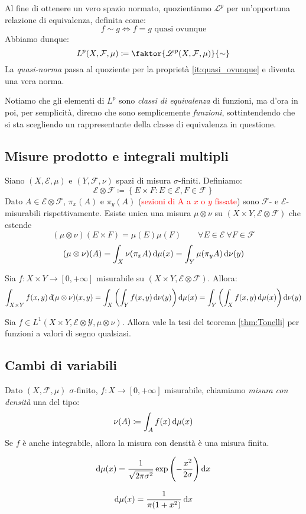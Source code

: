 Al fine di ottenere un vero spazio normato, quozientiamo $ \mathscr{L}^p $ per un'opportuna relazione di equivalenza, definita come:
\[ f \sim g \iff f = g \text{ quasi ovunque} \]
Abbiamo dunque:
\[ L^p(X,\mathcal{F},\mu) \coloneqq \faktor{\mathscr{L}^p(X,\mathcal{F},\mu)}{\sim} \]
La \emph{quasi-norma} passa al quoziente per la proprietà \eqref{it:quasi_ovunque} e diventa una vera norma.

Notiamo che gli elementi di $ L^p $ sono \emph{classi di equivalenza} di funzioni, ma d'ora in poi, per semplicità, diremo che sono semplicemente \emph{funzioni}, sottintendendo che si sta scegliendo un rappresentante della classe di equivalenza in questione.

\subsection{Misure prodotto e integrali multipli}
Siano $ (X,\mathcal{E},\mu) $ e $ (Y,\mathcal{F},\nu) $ spazi di misura $ \sigma $-finiti. Definiamo:
\[ \mathcal{E} \otimes \mathcal{F} \coloneqq \left\{ E\times F : E \in \mathcal{E}, F \in \mathcal{F} \right\} \]
Dato $ A \in \mathcal{E}\otimes\mathcal{F} $, $ \pi_x(A) $ e $ \pi_y(A) $ (\textcolor{red}{sezioni di A a $ x $ o $ y $ fissate}) sono $ \mathcal{F} $- e $ \mathcal{E} $-misurabili rispettivamente.
Esiste unica una misura $ \mu\otimes\nu $ su $ (X\times Y, \mathcal{E}\otimes\mathcal{F}) $ che estende
\[ (\mu\otimes\nu)(E\times F) = \mu(E)\mu(F) \qquad \forall E\in\mathcal{E}\ \forall F\in\mathcal{F} \]
\[ (\mu\otimes\nu)(A) = \int_X \nu(\pi_x A)\dif\mu(x) = \int_Y \mu(\pi_y A)\dif\nu(y) \]
\begin{thm}[Tonelli]\label{thm:Tonelli}
    Sia $ f\colon X\times Y \to [0,+\infty] $ misurabile su $ (X\times Y,\mathcal{E}\otimes\mathcal{F}) $. Allora:
    \[ \int_{X\times Y} f(x,y)\dif(\mu\otimes\nu)(x,y) = \int_X \left( \int_Y f(x,y) \dif\nu(y) \right) \dif\mu(x) = \int_Y \left( \int_X f(x,y) \dif\mu(x) \right) \dif\nu(y) \]
\end{thm}
\begin{thm}[Fubini]
    Sia $ f \in L^1(X\times Y,\mathcal{E}\otimes\mathcal{Y},\mu\otimes\nu) $. Allora vale la tesi del teorema \ref{thm:Tonelli} per funzioni a valori di segno qualsiasi.
\end{thm}

\subsection{Cambi di variabili}
Dato $ (X,\mathcal{F},\mu) $ $ \sigma $-finito, $ f\colon X\to[0,+\infty] $ misurabile, chiamiamo \emph{misura con densità} una del tipo:
\[ \nu(A) \coloneqq \int_A f(x)\dif\mu(x) \]
Se $ f $ è anche integrabile, allora la misura con densità è una misura finita.
\begin{example}[Gaussiana su $ \R $]
    \[ \dif\mu(x) = \frac{1}{\sqrt{2\pi\sigma^2}} \exp{\left (-\frac{x^2}{2\sigma}\right )} \dif x \]
\end{example}
\begin{example}
    \[ \dif\mu(x) = \frac{1}{\pi(1+x^2)}\dif x \]
\end{example}

